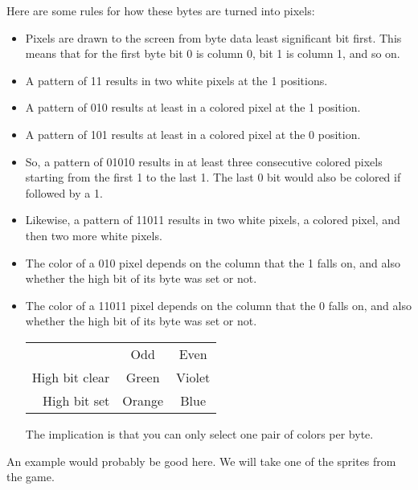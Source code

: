 \documentclass[10pt]{report}%
\begin{document}
Here are some rules for how these bytes are turned into pixels:
\begin{itemize}
  \item Pixels are drawn to the screen from byte data least significant bit first.
        This means that for the first byte bit 0 is column 0, bit 1 is column 1,
        and so on.
  \item A pattern of {\Tt{}11\nwendquote} results in two white pixels at the {\Tt{}1\nwendquote} positions.
  \item A pattern of {\Tt{}010\nwendquote} results at least in a colored pixel at the {\Tt{}1\nwendquote} position.
  \item A pattern of {\Tt{}101\nwendquote} results at least in a colored pixel at the {\Tt{}0\nwendquote} position.
  \item So, a pattern of {\Tt{}01010\nwendquote} results in at least three consecutive colored
        pixels starting from the first {\Tt{}1\nwendquote} to the last {\Tt{}1\nwendquote}. The last {\Tt{}0\nwendquote} bit
        would also be colored if followed by a {\Tt{}1\nwendquote}.
  \item Likewise, a pattern of {\Tt{}11011\nwendquote} results in two white pixels, a colored pixel,
        and then two more white pixels.
  \item The color of a {\Tt{}010\nwendquote} pixel depends on the column that the {\Tt{}1\nwendquote} falls on, and
        also whether the high bit of its byte was set or not. 
  \item The color of a {\Tt{}11011\nwendquote} pixel depends on the column that the {\Tt{}0\nwendquote} falls on, and
        also whether the high bit of its byte was set or not.

        \begin{center}
        \begin{tabular}{@{}rcc@{}} \toprule
        & Odd & Even \\ \cmidrule(r){2-3}
        High bit clear & Green & Violet \\
        High bit set & Orange & Blue \\ \bottomrule
        \end{tabular}
        \end{center}

        The implication is that you can only select one pair of colors per byte.
\end{itemize}

An example would probably be good here. We will take one of the sprites from the game.
\end{document}
